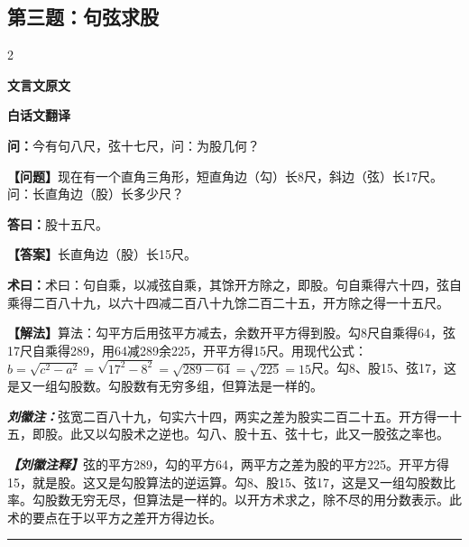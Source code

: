 \documentclass[10pt,a4paper]{article}
\newcommand{\wen}[1]{\textbf{\color{problemcolor}问：}#1\par}
\newcommand{\da}[1]{\textbf{答曰：}#1\par}
\newcommand{\shu}[1]{\textbf{术曰：}#1\par}
\newcommand{\liuhui}[1]{{\color{commentarycolor}\textit{\textbf{刘徽注：}}#1\par}}
\newcommand{\classicalheader}[1]{{\centering\large\bfseries\color{classicalcolor} #1\par\vspace{0.5em}}}
\newcommand{\wenmodern}[1]{\textbf{\color{moderncolor}【问题】}#1\par}
\newcommand{\damodern}[1]{\textbf{【答案】}#1\par}
\newcommand{\shumodern}[1]{\textbf{【解法】}#1\par}
\newcommand{\liuhuimodern}[1]{{\color{commentarycolor}\textit{\textbf{【刘徽注释】}}#1\par}}
\newcommand{\modernheader}[1]{{\centering\large\bfseries\color{moderncolor} #1\par\vspace{0.5em}}}
\newcommand{\problemsec}[1]{\subsection*{#1}}
\begin{document}
\problemsec{第三题：句弦求股}
\begin{paracol}{2}
\classicalheader{文言文原文}
\switchcolumn
\modernheader{白话文翻译}
\switchcolumn*

\wen{今有句八尺，弦十七尺，问：为股几何？}

\switchcolumn

\wenmodern{现在有一个直角三角形，短直角边（勾）长8尺，斜边（弦）长17尺。问：长直角边（股）长多少尺？}

\switchcolumn*

\da{股十五尺。}

\switchcolumn

\damodern{长直角边（股）长15尺。}

\switchcolumn*

\shu{术曰：句自乘，以减弦自乘，其馀开方除之，即股。句自乘得六十四，弦自乘得二百八十九，以六十四减二百八十九馀二百二十五，开方除之得一十五尺。}

\switchcolumn

\shumodern{算法：勾平方后用弦平方减去，余数开平方得到股。勾8尺自乘得64，弦17尺自乘得289，用64减289余225，开平方得15尺。用现代公式：$b=\sqrt{c^2-a^2}=\sqrt{17^2-8^2}=\sqrt{289-64}=\sqrt{225}=15$尺。勾8、股15、弦17，这是又一组勾股数。勾股数有无穷多组，但算法是一样的。}

\switchcolumn*

\liuhui{弦宽二百八十九，句实六十四，两实之差为股实二百二十五。开方得一十五，即股。此又以勾股术之逆也。勾八、股十五、弦十七，此又一股弦之率也。}

\switchcolumn

\liuhuimodern{弦的平方289，勾的平方64，两平方之差为股的平方225。开平方得15，就是股。这又是勾股算法的逆运算。勾8、股15、弦17，这是又一组勾股数比率。勾股数无穷无尽，但算法是一样的。以开方术求之，除不尽的用分数表示。此术的要点在于以平方之差开方得边长。}

\end{paracol}

\vspace{0.3cm}
\hrule
\vspace{0.3cm}
\end{document}
